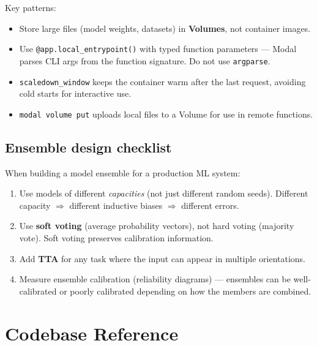 \documentclass[12pt,a4paper]{article}
\begin{document}
Key patterns:
\begin{itemize}
  \item Store large files (model weights, datasets) in \textbf{Volumes}, not container images.
  \item Use \texttt{@app.local\_entrypoint()} with typed function parameters --- Modal parses
    CLI args from the function signature. Do not use \texttt{argparse}.
  \item \texttt{scaledown\_window} keeps the container warm after the last request, avoiding
    cold starts for interactive use.
  \item \texttt{modal volume put} uploads local files to a Volume for use in remote functions.
\end{itemize}

\subsection{Ensemble design checklist}

When building a model ensemble for a production ML system:
\begin{enumerate}
  \item Use models of different \emph{capacities} (not just different random seeds).
    Different capacity $\Rightarrow$ different inductive biases $\Rightarrow$ different errors.
  \item Use \textbf{soft voting} (average probability vectors), not hard voting (majority vote).
    Soft voting preserves calibration information.
  \item Add \textbf{TTA} for any task where the input can appear in multiple orientations.
  \item Measure ensemble calibration (reliability diagrams) --- ensembles can be well-calibrated
    or poorly calibrated depending on how the members are combined.
\end{enumerate}

\section{Codebase Reference}
\end{document}
